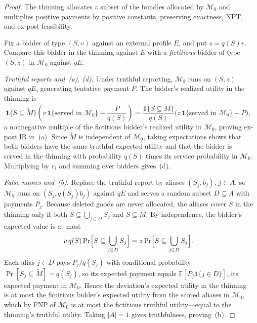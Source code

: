 \documentclass[format=acmsmall, review=false]{acmart}
\newcommand{\E}{\mathbb{E}}
\theoremstyle{acmdefinition}%
\begin{document}
\begin{proof}
The thinning allocates a subset of the bundles allocated by
\(\mathcal M_0\) and multiplies positive payments by positive
constants, preserving exactness, NPT, and ex-post feasibility.

Fix a bidder of type \((S,v)\) against an external profile \(E\),
and put \(z=q(S)v\). Compare this bidder in the thinning against
\(E\) with a \emph{fictitious} bidder of type \((S,z)\) in
\(\mathcal M_0\) against \(qE\).

\emph{Truthful reports and~(a), (d).} Under truthful reporting,
\(\mathcal M_0\) runs on \((S,z)\) against \(qE\), generating
tentative payment \(P\). The bidder's realized utility in the
thinning is
\begin{equation}\label{eq:thin-truthful}
\mathbf{1}\{S\subseteq\widetilde M\}
\left(v\,\mathbf{1}\{\text{served in }\mathcal M_0\}-\frac{P}{q(S)}\right)
=\frac{\mathbf{1}\{S\subseteq\widetilde M\}}{q(S)}
\bigl(z\,\mathbf{1}\{\text{served in }\mathcal M_0\}-P\bigr),
\end{equation}
a nonnegative multiple of the fictitious bidder's realized utility
in \(\mathcal M_0\), proving ex-post IR in~(a). Since
\(\widetilde M\) is independent of \(\mathcal M_0\), taking
expectations shows that both bidders have the same truthful
expected utility and that the bidder is served in the thinning
with probability \(q(S)\) times its service probability in
\(\mathcal M_0\). Multiplying by \(v_i\) and summing over bidders
gives~(d).

\emph{False names and~(b).} Replace the truthful report by aliases
\((S_j,b_j)\), \(j\in A\), so \(\mathcal M_0\) runs on
\((S_j,q(S_j)b_j)\) against \(qE\) and serves a random subset
\(D\subseteq A\) with payments \(P_j\). Because deleted goods are
never allocated, the aliases cover \(S\) in the thinning only if
both \(S\subseteq\bigcup_{j\in D}S_j\) and
\(S\subseteq\widetilde M\). By independence, the bidder's expected
value is at most
\[
v\,q(S)\Pr\Bigl[S\subseteq\bigcup_{j\in D}S_j\Bigr]
=z\Pr\Bigl[S\subseteq\bigcup_{j\in D}S_j\Bigr].
\]
Each alias \(j\in D\) pays \(P_j/q(S_j)\) with conditional
probability \(\Pr[S_j\subseteq\widetilde M]=q(S_j)\), so its
expected payment equals \(\E[P_j\mathbf{1}\{j\in D\}]\), its
expected payment in \(\mathcal M_0\). Hence the deviation's
expected utility in the thinning is at most the fictitious
bidder's expected utility from the scored aliases in
\(\mathcal M_0\), which by FNP of \(\mathcal M_0\) is at most the
fictitious truthful utility---equal to the thinning's truthful
utility. Taking \(|A|=1\) gives truthfulness, proving~(b).


\end{proof}
\end{document}
